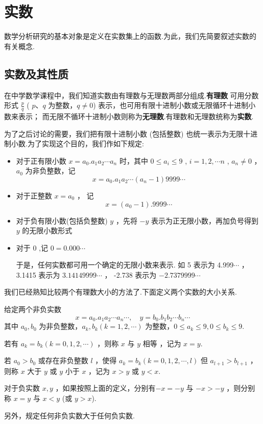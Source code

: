 \section{实数}

数学分析研究的基本对象是定义在实数集上的函数.为此，我们先简要叙述实数的有关概念.

\subsection{实数及其性质}

在中学数学课程中，我们知道实数由有理数与无理数两部分组成.\textbf{有理数} 可用分数形式 $\frac{p}{q}$ ( $p$、$q$ 为整数，$q \neq 0$) 表示，也可用有限十进制小数或无限循环十进制小数来表示； 而无限不循环十进制小数则称为\textbf{无理数}.有理数和无理数统称为\textbf{实数}.

为了之后讨论的需要，我们把有限十进制小数 (包括整数) 也统一表示为无限十进制小数.为了实现这个目的，我们作如下规定:
\begin{itemize}
    \item 对于正有限小数 $x=a_0.a_1 a_2 \cdots a_n$ 时，其中 $0 \leq a_i \leq 9$ , $i=1,2,\cdots n$ , $a_n \ne 0$ ，$a_0$ 为非负整数，记
    \[
        x = a_0.a_1 a_2 \cdots (a_n-1) 9999\cdots
    \]
    \item 对于正整数 $x=a_0$ ， 记
    \[
        x = (a_0-1).9999\cdots
    \]
    \item 对于负有限小数(包括负整数) $y$ ，先将 $-y$ 表示为正无限小数，再加负号得到 $y$ 的无限小数形式
    \item 对于 0 ,记 $0=0.000 \cdots$

    于是，任何实数都可用一个确定的无限小数来表示. 如 5 表示为 4.999$\cdots$ ， 3.1415 表示为 $3.14149999 \cdots$ ， -2.738 表示为 $-2.7379999 \cdots$
\end{itemize}

我们已经熟知比较两个有理数大小的方法了.下面定义两个实数的大小关系.

\begin{definition}
[非负实数的大小]
 给定两个非负实数
\[
  x=a_0.a_1 a_2 \cdots a_n \cdots, \quad y=b_0.b_1 b_2 \cdots b_n \cdots
\]
其中 $a_0,b_0$ 为非负整数，$a_k,b_k(k=1,2,\cdots)$ 为整数，$0\le a_k \le 9,0\le b_k \le 9$.

\textbullet 若有 $a_k = b_k(k=0,1,2,\cdots)$ ，则称 $x$ 与 $y$ 相等 ，记为 $x=y$.
    
\textbullet 若 $a_0>b_0$ 或存在非负整数 $l$ ，使得 $a_k = b_k(k=0,1,2,\cdots,l)$ 但 $a_{l+1}>b_{l+1}$ ，则称 $x$ 大于 $y$ 或 $y$ 小于 $x$ ，记为 $x>y$ 或 $y<x$.

\qquad 对于负实数 $x,y$ ，如果按照上面的定义，分别有$-x=-y$ 与 $-x>-y$ ，则分别称 $x=y$ 与 $x<y$ (或 $y>x$).

\qquad 另外，规定任何非负实数大于任何负实数.    
\end{definition}

